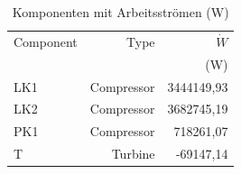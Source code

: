\begin{longtable}{lrr}
\caption{Komponenten mit Arbeitsströmen (W)} \\
\hline
Component & Type & $\dot W$ \\
 &  & (W) \\
\hline
LK1 & Compressor & 3444149,93 \\
LK2 & Compressor & 3682745,19 \\
PK1 & Compressor & 718261,07 \\
T & Turbine & -69147,14 \\
\hline
\end{longtable}
